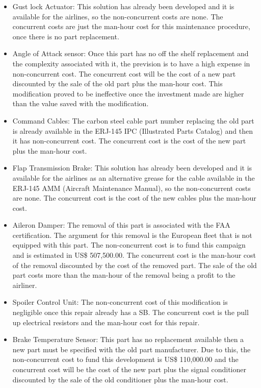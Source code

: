 \begin{itemize}
\item 	Gust lock Actuator: This solution has already been developed and it is available for the airlines, so the non-concurrent costs are none. The concurrent costs are just the man-hour cost for this maintenance procedure, once there is no part replacement.
\item 	Angle of Attack sensor: Once this part has no off the shelf replacement and the complexity associated with it, the prevision is to have a high expense in non-concurrent cost. The concurrent cost will be the cost of a new part discounted by the sale of the old part plus the man-hour cost. This modification proved to be ineffective once the investment made are higher than the value saved with the modification.
\item 	Command Cables: The carbon steel cable part number replacing the old part is already available in the ERJ-145 IPC (Illustrated Parts Catalog) and then it has non-concurrent cost. The concurrent cost is the cost of the new part plus the man-hour cost.
\item	Flap Transmission Brake: This solution has already been developed and it is available for the airlines as an alternative grease for the cable available in the ERJ-145 AMM (Aircraft Maintenance Manual), so the non-concurrent costs are none. The concurrent cost is the cost of the new cables plus the man-hour cost.
\item	Aileron Damper: The removal of this part is associated with the FAA certification. The argument for this removal is the European fleet that is not equipped with this part. The non-concurrent cost is to fund this campaign and is estimated in US\$ 507,500.00. The concurrent cost is the man-hour cost of the removal discounted by the cost of the removed part. The sale of the old part costs more than the man-hour of the removal being a profit to the airliner.
\item	Spoiler Control Unit: The non-concurrent cost of this modification is negligible once this repair already has a SB. The concurrent cost is the pull up electrical resistors and the man-hour cost for this repair.
\item	Brake Temperature Sensor: This part has no replacement available then a new part must be specified with the old part manufacturer. Due to this, the non-concurrent cost to fund this development is US\$ 110,000.00 and the concurrent cost will be the cost of the new part plus the signal conditioner discounted by the sale of the old conditioner plus the man-hour cost.

\end{itemize}
